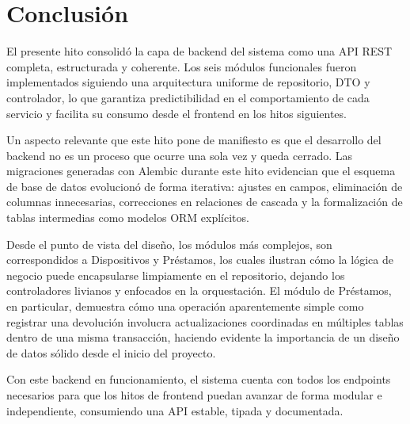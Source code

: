 \section{Conclusión}

El presente hito consolidó la capa de backend del sistema como una API REST completa, 
estructurada y coherente. Los seis módulos funcionales fueron implementados siguiendo una 
arquitectura uniforme de repositorio, DTO y controlador, lo que garantiza 
predictibilidad en el comportamiento de cada servicio y facilita su consumo desde el 
frontend en los hitos siguientes.

Un aspecto relevante que este hito pone de manifiesto es que el desarrollo del backend 
no es un proceso que ocurre una sola vez y queda cerrado. Las migraciones generadas 
con Alembic durante este hito evidencian que el esquema de base de datos evolucionó 
de forma iterativa: ajustes en campos, eliminación de columnas innecesarias, 
correcciones en relaciones de cascada y la formalización de tablas intermedias como 
modelos ORM explícitos.

Desde el punto de vista del diseño, los módulos más complejos, son correspondidos a Dispositivos y 
Préstamos, los cuales ilustran cómo la lógica de negocio puede encapsularse limpiamente en el 
repositorio, dejando los controladores livianos y enfocados en la orquestación.
El módulo de Préstamos, en particular, demuestra cómo una operación aparentemente 
simple como registrar una devolución involucra actualizaciones coordinadas en múltiples 
tablas dentro de una misma transacción, haciendo evidente la importancia de un diseño 
de datos sólido desde el inicio del proyecto.

Con este backend en funcionamiento, el sistema cuenta con todos los endpoints necesarios 
para que los hitos de frontend puedan avanzar de forma modular e independiente, 
consumiendo una API estable, tipada y documentada.
